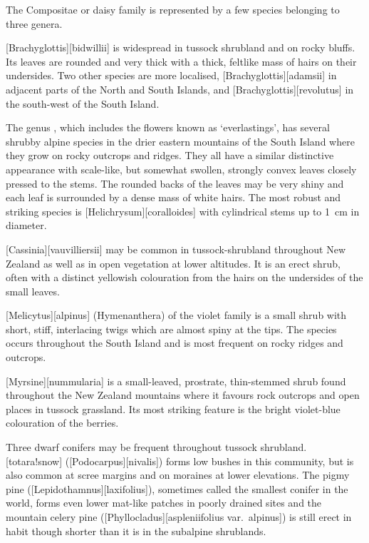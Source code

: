 The Compositae or daisy family is represented by a few species belonging to three genera.

[Brachyglottis][bidwillii] is widespread in tussock shrubland and on rocky bluffs.
Its leaves are rounded and very thick with a thick, feltlike mass of hairs on their undersides.
Two other species are more localised, [Brachyglottis][adamsii] in adjacent parts of the North and South Islands, and [Brachyglottis][revolutus] in the south-west of the South Island.

The genus , which includes the flowers known as `everlastings', has several shrubby alpine species in the drier eastern mountains of the South Island where they grow on rocky outcrops and ridges.
They all have a similar distinctive appearance with scale-like, but somewhat swollen, strongly convex leaves closely pressed to the stems.
The rounded backs of the leaves may be very shiny and each leaf is surrounded by a dense mass of white hairs.
The most robust and striking species is [Helichrysum][coralloides] with cylindrical stems up to \SI{1}{\centi\metre} in diameter.

[Cassinia][vauvilliersii] may be common in tussock-shrubland throughout New Zealand as well as in open vegetation at lower altitudes.
It is an erect shrub, often with a distinct yellowish colouration from the hairs on the undersides of the small leaves.

[Melicytus][alpinus] (Hymenanthera) of the violet family is a small shrub with short, stiff, interlacing twigs which are almost spiny at the tips.
The species occurs throughout the South Island and is most frequent on rocky ridges and outcrops.

[Myrsine][nummularia] is a small-leaved, prostrate, thin-stemmed shrub found throughout the New Zealand mountains where it favours rock outcrops and open places in tussock grassland.
Its most striking feature is the bright violet-blue colouration of the berries.

Three dwarf conifers may be frequent throughout tussock shrubland.
[totara!snow] ([Podocarpus][nivalis]) forms low bushes in this community, but is also common at scree margins and on moraines at lower elevations.
The pigmy pine ([Lepidothamnus][laxifolius]), sometimes called the smallest conifer in the world, forms even lower mat-like patches in poorly drained sites and the mountain celery pine ([Phyllocladus][aspleniifolius var.\ alpinus]) is still erect in habit though shorter than it is in the subalpine shrublands.

